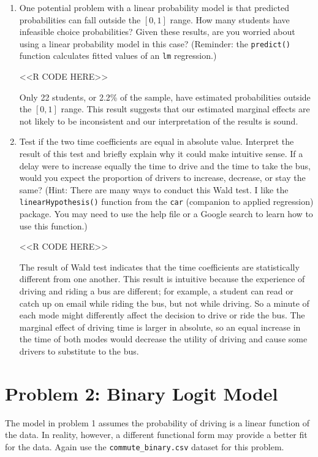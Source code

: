 \documentclass[11pt,letterpaper]{article}
\begin{document}
\begin{enumerate}[label=\alph*., leftmargin=*]
\begin{enumerate}[label=\roman*.]
		\item One potential problem with a linear probability model is that predicted probabilities can fall outside the $[0, 1]$ range. How many students have infeasible choice probabilities? Given these results, are you worried about using a linear probability model in this case? (Reminder: the \texttt{predict()} function calculates fitted values of an \texttt{lm} regression.)

		<<R CODE HERE>>

		Only 22 students, or 2.2\% of the sample, have estimated probabilities outside the $[0, 1]$ range. This result suggests that our estimated marginal effects are not likely to be inconsistent and our interpretation of the results is sound.

		\item Test if the two time coefficients are equal in absolute value. Interpret the result of this test and briefly explain why it could make intuitive sense. If a delay were to increase equally the time to drive and the time to take the bus, would you expect the proportion of drivers to increase, decrease, or stay the same? (Hint: There are many ways to conduct this Wald test. I like the \texttt{linearHypothesis()} function from the \texttt{car} (companion to applied regression) package. You may need to use the help file or a Google search to learn how to use this function.) 

		<<R CODE HERE>>

		The result of Wald test indicates that the time coefficients are statistically different from one another. This result is intuitive because the experience of driving and riding a bus are different; for example, a student can read or catch up on email while riding the bus, but not while driving. So a minute of each mode might differently affect the decision to drive or ride the bus. The marginal effect of driving time is larger in absolute, so an equal increase in the time of both modes would decrease the utility of driving and cause some drivers to substitute to the bus.
	\end{enumerate}
\end{enumerate}

\section*{Problem 2: Binary Logit Model}

The model in problem 1 assumes the probability of driving is a linear function of the data. In reality, however, a different functional form may provide a better fit for the data. Again use the \texttt{commute\_binary.csv} dataset for this problem.
\end{document}
